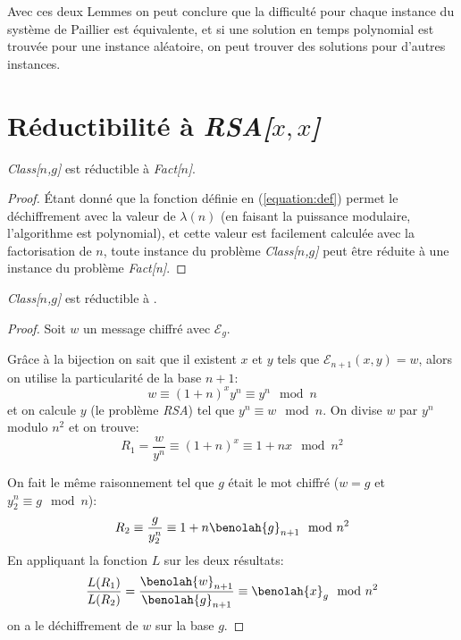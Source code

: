 	Avec ces deux Lemmes on peut conclure que la difficulté pour chaque instance du système de Paillier est équivalente, 
	et si une solution en temps polynomial est trou\-vée pour une instance aléatoire, on peut trouver des solutions 
	pour d'autres instances.



\section{Réductibilité à \emph{RSA[$x,x$]}}
	\begin{theorem} \emph{Class[$n$,$g$]} est réductible à \emph{Fact[$n$]}.
		\label{theorem:rsa}
		\begin{proof}
			Étant donné que la fonction définie en (\ref{equation:def}) permet
			le déchif\-frement avec la valeur de $\lambda(n)$
			(en faisant la puissance modulaire, l'algorithme est polynomial), et cette
			valeur est facilement calculée avec la factorisation de $n$,
			toute instance du problème \emph{Class[$n$,$g$]} peut être 
			réduite à une instance du problème \emph{Fact[n]}.
		\end{proof}
	\end{theorem} 
	\begin{theorem} \emph{Class[$n$,$g$]} est réductible à .
		\label{theorem:fact}
		\begin{proof}
			Soit $w$ un message chiffré avec $\mathcal{E}_g$. 

			Grâce à la bijection on sait que il existent $x$ et $y$ tels que
			$\mathcal{E}_{n+1}(x,y) = w$, alors on utilise la particularité de 
			la base $n+1$:
			$$w \equiv (1+n)^xy^n \equiv y^n\mod n$$
			et on calcule $y$ (le problème \emph{RSA}) tel que $y^n \equiv w \mod{n}$. On divise $w$ par
			$y^n$ modulo $n^2$ et on trouve: $$R_1=\frac{w}{y^n} \equiv (1+n)^x \equiv 1+nx\mod{n^2}$$

			On fait le même raisonnement tel que $g$ était le mot chiffré ($w = g$ et $y_2^n \equiv g\mod{n}$):
			$$R_2 \equiv \frac{g}{y_2^n} \equiv 1+n\benolah{g}_{n+1}\mod{n^2}$$
			En appliquant la fonction $L$ sur les deux résultats:
				$$\frac{L(R_1)}{L(R_2)} = \frac{\benolah{w}_{n+1}}{\benolah{g}_{n+1}} \equiv \benolah{x}_{g} \mod{n^2} $$ 
			on a le déchiffrement de $w$ sur la base $g$.	
		\end{proof}
	\end{theorem}
